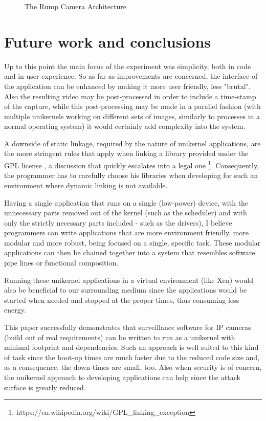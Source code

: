\documentclass[10pt,a4paper,twoside]{article}
\begin{document}
\begin{figure}
  \centering
  \caption{The Rump Camera Architecture}
  \label{fig:archdiagram}
\end{figure}

\section{Future work and conclusions}

Up to this point the main focus of the experiment was simplicity, both in code and in user experience.
So as far as improvements are concerned, the interface of the application can be enhanced by making
it more user friendly, less "brutal". Also the resulting video may be post-processed in order to
include a time-stamp of the capture,
while this post-processing may be made in a parallel fashion (with multiple unikernels working
on different sets of images, similarly to processes in a normal operating system) it would certainly add complexity
into the system.

A downside of static linkage, required by the nature of unikernel applications, are the more
stringent rules that apply when linking a library provided under the GPL license \cite{gpl},
a discussion that quickly escalates into a legal one
\footnote{https://en.wikipedia.org/wiki/GPL\_linking\_exception}. Consequently,
the programmer has to carefully choose his libraries when developing for such an environment where
dynamic linking is not available.

Having a single application that runs on a single (low-power) device, with the unnecessary parts removed out
of the kernel (such as the scheduler) and with only the strictly necessary parts included - such as the drivers),
I believe programmers can write applications that are more environment friendly,
more modular and more robust, being focused on a single, specific task. These modular applications can
then be chained together into a system that resembles software pipe lines or functional composition.

Running these unikernel applications in a virtual environment (like Xen) would also be
beneficial to our surrounding medium since the applications would be started when
needed and stopped at the proper times, thus consuming less energy. \cite{DataCenterEnergyForeCast} \cite{JinWenChen}

This paper successfully demonstrates that surveillance software for IP cameras
(build out of real requirements) can be written to run as a unikernel with minimal footprint and dependencies.
 Such an approach is well suited to this kind of task since the boot-up times
 are much faster due to the reduced code size and, as a consequence, the down-times are small, too.
 Also when security is of concern, the unikernel approach to developing applications can help since
 the attack surface is greatly reduced.
\end{document}
